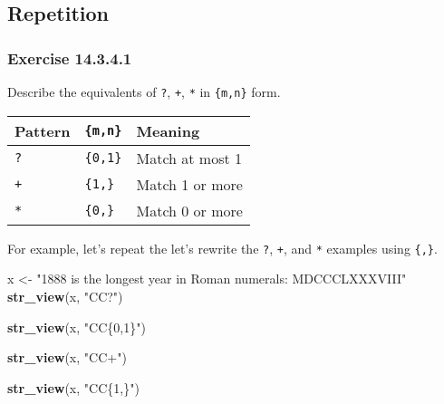 \documentclass[]{book}
\newenvironment{Shaded}{\begin{snugshade}}{\end{snugshade}}
\newcommand{\KeywordTok}[1]{\textcolor[rgb]{0.13,0.29,0.53}{\textbf{#1}}}
\newcommand{\NormalTok}[1]{#1}
\newcommand{\StringTok}[1]{\textcolor[rgb]{0.31,0.60,0.02}{#1}}
\theoremstyle{plain}
\theoremstyle{remark}
\theoremstyle{definition}
\theoremstyle{definition}
\theoremstyle{definition}
\theoremstyle{remark}
\begin{document}
\hypertarget{repetition}{%
\subsection{Repetition}\label{repetition}}

\hypertarget{exercise-14.3.4.1}{%
\subsubsection*{\texorpdfstring{Exercise
{14.3.4.1}}{Exercise 14.3.4.1}}\label{exercise-14.3.4.1}}

Describe the equivalents of \texttt{?}, \texttt{+}, \texttt{*} in
\texttt{\{m,n\}} form.

\begin{longtable}[]{@{}lll@{}}
\toprule
Pattern & \texttt{\{m,n\}} & Meaning\tabularnewline
\midrule
\endhead
\texttt{?} & \texttt{\{0,1\}} & Match at most 1\tabularnewline
\texttt{+} & \texttt{\{1,\}} & Match 1 or more\tabularnewline
\texttt{*} & \texttt{\{0,\}} & Match 0 or more\tabularnewline
\bottomrule
\end{longtable}

For example, let's repeat the let's rewrite the \texttt{?}, \texttt{+},
and \texttt{*} examples using \texttt{\{,\}}.

\begin{Shaded}
\begin{Highlighting}[]
\NormalTok{x <-}\StringTok{ "1888 is the longest year in Roman numerals: MDCCCLXXXVIII"}
\KeywordTok{str_view}\NormalTok{(x, }\StringTok{"CC?"}\NormalTok{)}
\end{Highlighting}
\end{Shaded}

\begin{Shaded}
\begin{Highlighting}[]
\KeywordTok{str_view}\NormalTok{(x, }\StringTok{"CC\{0,1\}"}\NormalTok{)}
\end{Highlighting}
\end{Shaded}

\begin{Shaded}
\begin{Highlighting}[]
\KeywordTok{str_view}\NormalTok{(x, }\StringTok{"CC+"}\NormalTok{)}
\end{Highlighting}
\end{Shaded}

\begin{Shaded}
\begin{Highlighting}[]
\KeywordTok{str_view}\NormalTok{(x, }\StringTok{"CC\{1,\}"}\NormalTok{)}
\end{Highlighting}
\end{Shaded}
\end{document}
